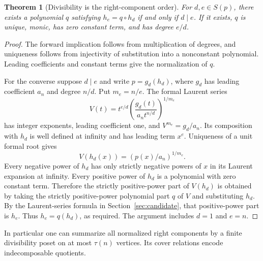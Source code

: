 \documentclass[11pt,a4paper]{article}
\numberwithin{equation}{section}
\newtheorem{theorem}{Theorem}[section]
\theoremstyle{definition}
\theoremstyle{remark}
\begin{document}
\begin{theorem}[Divisibility is the right-component order]\label{thm:poset}
For $d,e\in S(p)$, there exists a polynomial $q$ satisfying $h_e=q\circ h_d$ if and only if $d\mid e$. If it exists, $q$ is unique, monic, has zero constant term, and has degree $e/d$.
\end{theorem}
\begin{proof}
The forward implication follows from multiplication of degrees, and uniqueness follows from injectivity of substitution into a nonconstant polynomial. Leading coefficients and constant terms give the normalization of $q$.

For the converse suppose $d\mid e$ and write $p=g_d(h_d)$, where $g_d$ has leading coefficient $a_n$ and degree $n/d$. Put $m_e=n/e$. The formal Laurent series
\[
 V(t)=t^{e/d}\left(\frac{g_d(t)}{a_n t^{n/d}}\right)^{1/m_e}
\]
has integer exponents, leading coefficient one, and $V^{m_e}=g_d/a_n$. Its composition with $h_d$ is well defined at infinity and has leading term $x^e$. Uniqueness of a unit formal root gives
\[
 V(h_d(x))=\left(p(x)/a_n\right)^{1/m_e}.
\]
Every negative power of $h_d$ has only strictly negative powers of $x$ in its Laurent expansion at infinity. Every positive power of $h_d$ is a polynomial with zero constant term. Therefore the strictly positive-power part of $V(h_d)$ is obtained by taking the strictly positive-power polynomial part $q$ of $V$ and substituting $h_d$. By the Laurent-series formula in Section~\ref{sec:candidate}, that positive-power part is $h_e$. Thus $h_e=q(h_d)$, as required. The argument includes $d=1$ and $e=n$.
\end{proof}

In particular one can summarize all normalized right components by a finite divisibility poset on at most $\tau(n)$ vertices. Its cover relations encode indecomposable quotients.
\end{document}
